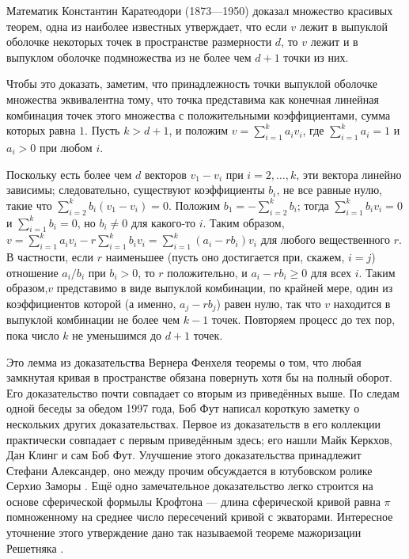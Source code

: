 Математик Константин Каратеодори (1873---1950) доказал множество красивых теорем, одна из наиболее известных утверждает, что если $v$ лежит в выпуклой оболочке некоторых точек в пространстве размерности $d$, то $v$ лежит и в выпуклом оболочке подмножества из не более чем $d+1$ точки из них.

Чтобы это доказать, заметим, что принадлежность точки выпуклой оболочке множества
эквивалентна тому, что точка представима как конечная линейная комбинация точек этого множества с положительными коэффициентами, сумма которых равна $1$.
Пусть $k>d+1$, и положим $v=\sum_{i=1}^k a_iv_i$, где $\sum_{i=1}^k a_i=1$ и $a_i>0$ при любом $i$.

Поскольку есть более чем $d$ векторов $v_1-v_i$ при $i=2,\dots,k$, эти вектора линейно зависимы;
следовательно, существуют коэффициенты $b_i$, не все равные нулю, такие что $\sum_{i=2}^k b_i(v_1-v_i)=0$.
Положим $b_1=-\sum_{i=2}^k b_i$; тогда $\sum_{i=1}^k b_i v_i=0$ и $\sum_{i=1}^k b_i=0$, но $b_i\ne 0$ для какого-то $i$.
Таким образом, $v=\sum_{i=1}^k a_iv_i-r\sum_{i=1}^k b_iv_i=\sum_{i=1}^k (a_i-rb_i)v_i$ для любого вещественного $r$.
В частности, если $r$ наименьшее (пусть оно достигается при, скажем, $i=j$) отношение $a_i/b_i$  при $b_i>0$, то $r$ положительно, и $a_i-rb_i\ge0$ для всех $i$.
Таким образом,$v$ представимо в виде выпуклой комбинации, по крайней мере, один из коэффициентов которой (а именно, $a_j-rb_j$) равен нулю, так что $v$ находится в выпуклой комбинации не более чем $k-1$ точек.
Повторяем процесс до тех пор, пока число $k$ не уменьшимся до $d+1$ точек.

\begin{addedbytheeditors}
Это лемма из доказательства Вернера Фенхеля \cite[Satz I$'$]{fenchel} теоремы о том, что любая замкнутая кривая в пространстве обязана повернуть хотя бы на полный оборот.
Его доказательство почти совпадает со вторым из приведённых выше.
По следам одной беседы за обедом 1997 года, Боб Фут написал короткую заметку о нескольких других доказательствах.
Первое из доказательств в его коллекции практически совпадает с первым приведённым здесь;
его нашли Майк Керкхов, Дан Клинг и сам Боб Фут.
Улучшение этого доказательства принадлежит Стефани Александер, оно между прочим обсуждается в ютубовском ролике Серхио Заморы \cite{zamora}.
Ещё одно замечательное доказательство легко строится на основе сферической формылы Крофтона --- длина сферической кривой равна $\pi$ помноженному на среднее число пересечений кривой с экваторами.
Интересное уточнение этого утверждение дано так называемой теореме мажоризации Решетняка \cite{reshetnyak}.
\end{addedbytheeditors}


